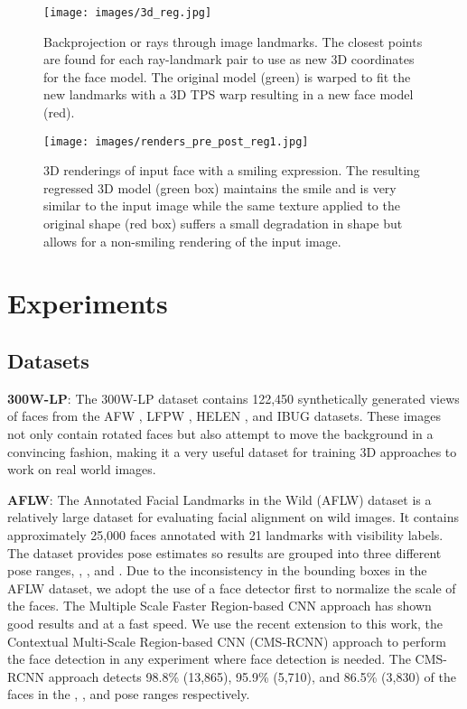 \documentclass[10pt,twocolumn,letterpaper]{article}
\begin{document}
\begin{figure}[t!]
\centering
\texttt{[image: images/3d\_reg.jpg]}
\caption{Backprojection or rays through image landmarks. The closest points are found for each ray-landmark pair to use as new 3D coordinates for the face model. The original model (green) is warped to fit the new landmarks with a 3D TPS warp resulting in a new face model (red).}
\label{fig:3Dwarp}
\end{figure}

\begin{figure}[t!]
\centering
\texttt{[image: images/renders\_pre\_post\_reg1.jpg]}
\caption{3D renderings of input face with a smiling expression. The resulting regressed 3D model (green box) maintains the smile and is very similar to the input image while the same texture applied to the original shape (red box) suffers a small degradation in shape but allows for a non-smiling rendering of the input image.}
\label{fig:3Dexpr}
\end{figure}

\section{Experiments}

\subsection{Datasets}
\textbf{300W-LP}: The 300W-LP \cite{Zhu16falp} dataset contains 122,450 synthetically generated views of faces from the AFW \cite{afw}, LFPW \cite{lfpw}, HELEN \cite{helen}, and IBUG \cite{ibug} datasets. These images not only contain rotated faces but also attempt to move the background in a convincing fashion, making it a very useful dataset for training 3D approaches to work on real world images.

\textbf{AFLW}: The Annotated Facial Landmarks in the Wild (AFLW) dataset \cite{aflw} is a relatively large dataset for evaluating facial alignment on wild images. It contains approximately 25,000 faces annotated with 21 landmarks with visibility labels. The dataset provides pose estimates so results are grouped into three different pose ranges, , , and . Due to the inconsistency in the bounding boxes in the AFLW dataset, we adopt the use of a face detector first to normalize the scale of the faces. The Multiple Scale Faster Region-based CNN approach \cite{msfrcnn} has shown good results and at a fast speed. We use the recent extension to this work, the Contextual Multi-Scale Region-based CNN (CMS-RCNN) approach \cite{cmsrcnn} to perform the face detection in any experiment where face detection is needed. The CMS-RCNN approach detects 98.8\% (13,865), 95.9\% (5,710), and 86.5\% (3,830) of the faces in the , , and  pose ranges respectively.
\end{document}
